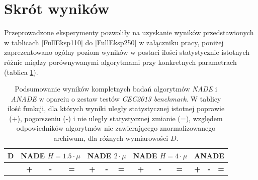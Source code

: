 \documentclass[12pt,a4paper]{report}
\begin{document}
{{{{{{{\section{Skrót wyników}
\par{
Przeprowadzone eksperymenty pozwoliły na uzyskanie wyników przedstawionych w tablicach \ref{FullEksp110} do \ref{FullEksp250} w załączniku pracy, poniżej zaprezentowano ogólny poziom wyników w postaci ilości statystycznie istotnych różnic między porównywanymi algorytmami przy konkretnych parametrach (tablica \ref{FULLSUMMARY}).
}

\begin{table}[h]
\centering
\caption{Podsumowanie wyników kompletnych badań algorytmów \emph{NADE} i \emph{ANADE} w oparciu o zestaw testów \emph{CEC2013 benchmark}. W tablicy ilość funkcji, dla których wyniki uległy statystycznej istotnej poprawie (+), pogorszeniu (-) i nie uległy statystycznej zmianie (=), względem odpowiedników algorytmów nie zawierającego znormalizowanego archiwum, dla różnych wymiarowości $D$.}
\label{FULLSUMMARY}
\begin{tabular}{|c|c|c|c|c|c|c|c|c|c|c|c|c|}
\hline
{\bf D}  & \multicolumn{3}{c|}{{\bf NADE $H=1.5 \cdot \mu$}} & \multicolumn{3}{c|}{{\bf NADE $2 \cdot \mu$}} & \multicolumn{3}{c|}{{\bf NADE $H=4 \cdot \mu$}} & \multicolumn{3}{c|}{{\bf ANADE}} \\ \hline
         & {\bf\hspace{3mm}+\hspace{3mm}}       & {\bf\hspace{4mm}-\hspace{4mm}}      & {\bf\hspace{1mm}=\hspace{1mm}}      & {\bf\hspace{1mm}+\hspace{1mm}}       & {\bf\hspace{1mm}-\hspace{1mm}}       & {\bf\hspace{1mm}=}       & {\bf\hspace{2mm}+\hspace{2mm}}        & {\bf\hspace{3mm}-\hspace{3mm}}        & {\bf\hspace{1mm}=\hspace{1mm}}       & {\bf\hspace{1mm}+\hspace{1mm}}   & {\bf\hspace{1mm}-\hspace{1mm}}   & {\bf\hspace{1mm}=\hspace{1mm}}  \\ \hline

\end{tabular}
\end{table}}}}}}}}
\end{document}
